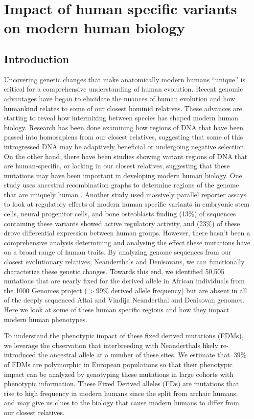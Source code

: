 \chapter{Impact of human specific variants on modern human biology}
\section{Introduction}
Uncovering genetic changes that make anatomically modern humans “unique” is critical for a comprehensive understanding of human evolution. Recent genomic advantages have began to elucidate the nuances of human evolution and how humankind relates to some of our closest hominid relatives. These advances are starting to reveal how intermixing between species has shaped modern human biology. Research has been done examining how regions of DNA that have been passed into homosapiens from our closest relatives, suggesting that some of this introgressed DNA may be adaptively beneficial or undergoing negative selection. On the other hand, there have been studies showing variant regions of DNA that are human-specific, or lacking in our closest relatives, suggesting that these mutations may have been important in developing modern human biology. 
One study uses ancestral recombination graphs to determine regions of the genome that are uniquely human \cite{schaefer2021ancestral}. 
Another study used massively parallel reporter assays to look at regulatory effects of modern human specific variants \cite{weiss2021cis} in embryonic stem cells, neural progenitor cells, and bone osteoblasts finding (13\%) of sequences containing these variants showed active regulatory activity, and (23\%) of these drove differential expression between human groups. However, there hasn't been a comprehensive analysis determining and analysing the effect these mutations have on a broad range of human traits.
By analyzing genome sequences from our closest evolutionary relatives, Neanderthals and Denisovans, we can functionally characterize these genetic changes. Towards this end, we identified 50,505 mutations that are nearly fixed for the derived allele in African individuals from the 1000 Genomes project ($>99\%$ derived allele frequency) but are absent in all of the deeply sequenced Altai and Vindija Neanderthal and Denisovan genomes. Here we look at some of these human specific regions and how they impact modern human phenotypes.

To understand the phenotypic impact of these fixed derived mutations (FDMs), we leverage the observation that interbreeding with Neanderthals likely re-introduced the ancestral allele at a number of these sites. We estimate that $~39\%$ of FDMs are polymorphic in European populations so that their phenotypic impact can be analyzed by genotyping these mutations in large cohorts with phenotypic information. These Fixed Derived alleles (FDs) are mutations that rise to high frequency  in  modern  humans  since  the  split  from  archaic humans, and may give us clues to the biology that cause modern humans to differ from our closest relatives.
